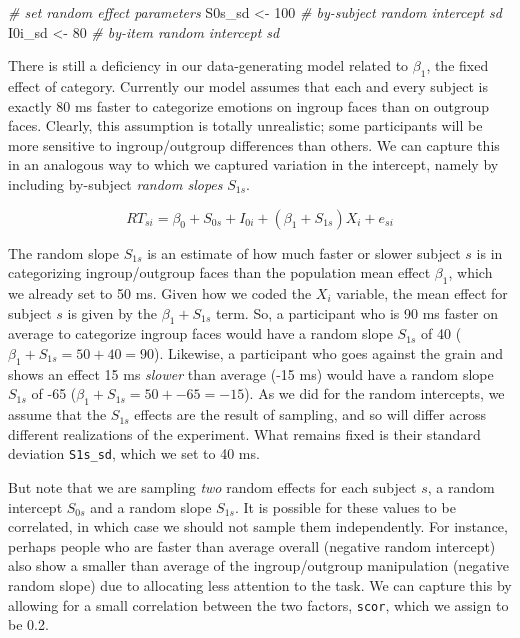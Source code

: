 \documentclass[doc,floatsintext]{apa6}
\newenvironment{Shaded}{\begin{snugshade}}{\end{snugshade}}
\newcommand{\DecValTok}[1]{\textcolor[rgb]{0.00,0.00,0.81}{#1}}
\newcommand{\StringTok}[1]{\textcolor[rgb]{0.31,0.60,0.02}{#1}}
\newcommand{\CommentTok}[1]{\textcolor[rgb]{0.56,0.35,0.01}{\textit{#1}}}
\newcommand{\NormalTok}[1]{#1}
\begin{document}
\begin{Shaded}
\begin{Highlighting}[]
\CommentTok{# set random effect parameters}
\NormalTok{S0s_sd <-}\StringTok{ }\DecValTok{100} \CommentTok{# by-subject random intercept sd}
\NormalTok{I0i_sd <-}\StringTok{  }\DecValTok{80} \CommentTok{# by-item random intercept sd}
\end{Highlighting}
\end{Shaded}

There is still a deficiency in our data-generating model related to
\(\beta_1\), the fixed effect of category. Currently our model assumes
that each and every subject is exactly 80 ms faster to categorize
emotions on ingroup faces than on outgroup faces. Clearly, this
assumption is totally unrealistic; some participants will be more
sensitive to ingroup/outgroup differences than others. We can capture
this in an analogous way to which we captured variation in the
intercept, namely by including by-subject \emph{random slopes}
\(S_{1s}\).

\begin{equation}
RT_{si} = \beta_0 + S_{0s} + I_{0i} + \left(\beta_1 + S_{1s}\right) X_i + e_{si}
\end{equation}

The random slope \(S_{1s}\) is an estimate of how much faster or slower
subject \(s\) is in categorizing ingroup/outgroup faces than the
population mean effect \(\beta_1\), which we already set to 50 ms. Given
how we coded the \(X_i\) variable, the mean effect for subject \(s\) is
given by the \(\beta_1 + S_{1s}\) term. So, a participant who is 90 ms
faster on average to categorize ingroup faces would have a random slope
\(S_{1s}\) of 40 (\(\beta_1 + S_{1s} = 50 + 40 = 90\)). Likewise, a
participant who goes against the grain and shows an effect 15 ms
\emph{slower} than average (-15 ms) would have a random slope \(S_{1s}\)
of -65 (\(\beta_1 + S_{1s} = 50 + -65 = -15\)). As we did for the random
intercepts, we assume that the \(S_{1s}\) effects are the result of
sampling, and so will differ across different realizations of the
experiment. What remains fixed is their standard deviation
\texttt{S1s\_sd}, which we set to 40 ms.

But note that we are sampling \emph{two} random effects for each subject
\(s\), a random intercept \(S_{0s}\) and a random slope \(S_{1s}\). It
is possible for these values to be correlated, in which case we should
not sample them independently. For instance, perhaps people who are
faster than average overall (negative random intercept) also show a
smaller than average of the ingroup/outgroup manipulation (negative
random slope) due to allocating less attention to the task. We can
capture this by allowing for a small correlation between the two
factors, \texttt{scor}, which we assign to be 0.2.
\end{document}
